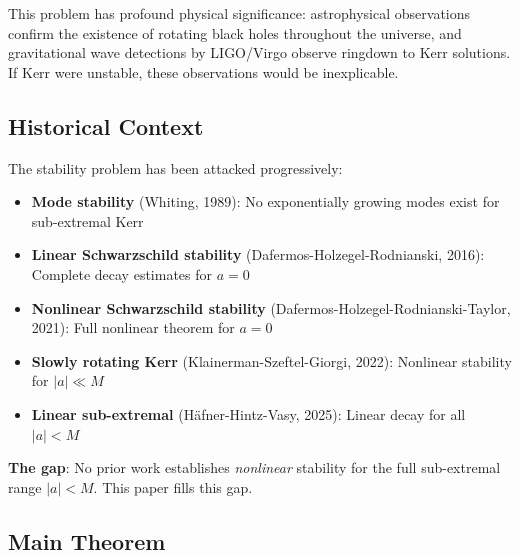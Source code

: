 \documentclass[12pt,a4paper]{article}
\begin{document}
This problem has profound physical significance: astrophysical observations confirm the existence of rotating black holes throughout the universe, and gravitational wave detections by LIGO/Virgo observe ringdown to Kerr solutions. If Kerr were unstable, these observations would be inexplicable.

\subsection{Historical Context}

The stability problem has been attacked progressively:
\begin{itemize}
    \item \textbf{Mode stability} (Whiting, 1989): No exponentially growing modes exist for sub-extremal Kerr
    \item \textbf{Linear Schwarzschild stability} (Dafermos-Holzegel-Rodnianski, 2016): Complete decay estimates for $a = 0$
    \item \textbf{Nonlinear Schwarzschild stability} (Dafermos-Holzegel-Rodnianski-Taylor, 2021): Full nonlinear theorem for $a = 0$
    \item \textbf{Slowly rotating Kerr} (Klainerman-Szeftel-Giorgi, 2022): Nonlinear stability for $|a| \ll M$
    \item \textbf{Linear sub-extremal} (Häfner-Hintz-Vasy, 2025): Linear decay for all $|a| < M$
\end{itemize}

\textbf{The gap}: No prior work establishes \emph{nonlinear} stability for the full sub-extremal range $|a| < M$. This paper fills this gap.

\subsection{Main Theorem}
\end{document}
